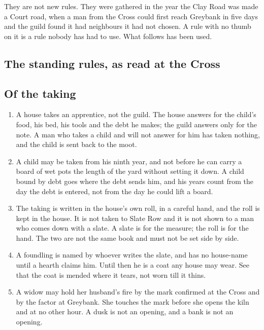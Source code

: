 \documentclass{design/chronicle}
\begin{document}
They are not new rules. They were gathered in the year the Clay Road was made a Court road, when a man from the Cross could first reach Greybank in five days and the guild found it had neighbours it had not chosen. A rule with no thumb on it is a rule nobody has had to use. What follows has been used.

\subsection*{The standing rules, as read at the Cross}

\subsection*{Of the taking}

\begin{enumerate}[leftmargin=1.4em,itemsep=1pt,topsep=3pt,parsep=0pt]

\item A house takes an apprentice, not the guild. The house answers for the child’s food, his bed, his tools and the debt he makes; the guild answers only for the note. A man who takes a child and will not answer for him has taken nothing, and the child is sent back to the moot.

\item A child may be taken from his ninth year, and not before he can carry a board of wet pots the length of the yard without setting it down. A child bound by debt goes where the debt sends him, and his years count from the day the debt is entered, not from the day he could lift a board.

\item The taking is written in the house’s own roll, in a careful hand, and the roll is kept in the house. It is not taken to Slate Row and it is not shown to a man who comes down with a slate. A slate is for the measure; the roll is for the hand. The two are not the same book and must not be set side by side.

\item A foundling is named by whoever writes the slate, and has no house-name until a hearth claims him. Until then he is a coat any house may wear. See that the coat is mended where it tears, not worn till it thins.

\item A widow may hold her husband’s fire by the mark confirmed at the Cross and by the factor at Greybank. She touches the mark before she opens the kiln and at no other hour. A dusk is not an opening, and a bank is not an opening.

\end{enumerate}
\end{document}
